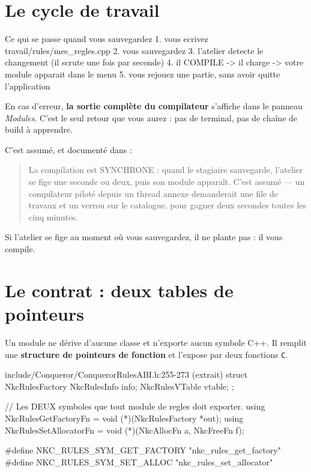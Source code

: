 \section{Le cycle de travail}

\begin{nkcode}{Ce qui se passe quand vous sauvegardez}
1.  vous ecrivez   travail/rules/mes_regles.cpp
2.  vous sauvegardez
3.  l'atelier detecte le changement (il scrute une fois par seconde)
4.  il COMPILE  ->  il charge  ->  votre module apparait dans le menu
5.  vous rejouez une partie, sans avoir quitte l'application
\end{nkcode}

En cas d'erreur, \textbf{la sortie complète du compilateur} s'affiche dans le
panneau \emph{Modules}. C'est le seul retour que vous aurez : pas de terminal,
pas de chaîne de build à apprendre.

\begin{nkpiege}
C'est assumé, et documenté dans  :

\begin{quote}\small
La compilation est SYNCHRONE : quand le stagiaire sauvegarde, l'atelier se fige
une seconde ou deux, puis son module apparaît. C'est assumé — un compilateur
piloté depuis un thread annexe demanderait une file de travaux et un verrou sur
le catalogue, pour gagner deux secondes toutes les cinq minutes.
\end{quote}

Si l'atelier se fige au moment où vous sauvegardez, il ne plante pas : il vous
compile.
\end{nkpiege}

\section{Le contrat : deux tables de pointeurs}

Un module ne dérive d'aucune classe et n'exporte aucun symbole C++. Il remplit
une \textbf{structure de pointeurs de fonction} et l'expose par deux fonctions
\texttt{C}.

\begin{nkcode}{include/Conqueror/ConquerorRulesABI.h:255-273 (extrait)}
struct NkcRulesFactory {
        NkcRulesInfo   info;
        NkcRulesVTable vtable;
};

// Les DEUX symboles que tout module de regles doit exporter.
using NkcRulesGetFactoryFn   = void (*)(NkcRulesFactory *out);
using NkcRulesSetAllocatorFn = void (*)(NkcAllocFn a, NkcFreeFn f);

#define NKC_RULES_SYM_GET_FACTORY "nkc_rules_get_factory"
#define NKC_RULES_SYM_SET_ALLOC   "nkc_rules_set_allocator"
\end{nkcode}

